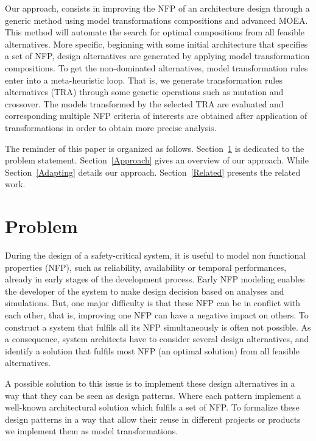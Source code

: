 \documentclass[conference]{IEEEtran}
\begin{document}
Our approach, consists in improving the NFP of an architecture design through a generic method using model transformations compositions and advanced MOEA. This method will automate the search for optimal compositions from all feasible alternatives. More specific, beginning with some initial architecture that specifies a set of NFP, design alternatives are generated by applying model transformation compositions\cite{Jouault:2005:TMA:2153686.2153705}. To get the non-dominated alternatives, model transformation rules enter into a meta-heuristic loop. That is, we generate transformation rules alternatives (TRA) through some genetic operations such as mutation and crossover. The models transformed by the selected TRA are evaluated and corresponding multiple NFP criteria of interests are obtained after application of transformations in order to obtain more precise analysis.

The reminder of this paper is organized as follows. Section~\ref{Problem} is dedicated to the problem statement. Section~\ref{Approach} gives an overview  of our approach. While Section~\ref{Adapting} details our approach. Section~\ref{Related} presents the related work.

\section{Problem}
\label{Problem}
During the design of a safety-critical system, it is useful to model non functional properties (NFP), such as reliability, availability or temporal performances, already in early stages of the development process. Early NFP modeling enables the developer of the system to make design decision based on analyses and simulations. But, one major difficulty is that these NFP can be in conflict with each other, that is, improving one NFP can have a negative impact on others. To construct a system that fulfils all its NFP simultaneously is often not possible. As a consequence, system architects have to consider several design alternatives, and identify a solution that fulfils most NFP (an optimal solution) from all feasible alternatives. 

A possible solution to this issue is to implement these design alternatives in a way that they can be seen as design patterns. Where each pattern implement a well-known architectural solution which fulfils a set of NFP. To formalize these design patterns in a way that allow their reuse in different projects or products we implement them as model transformations.
\end{document}
